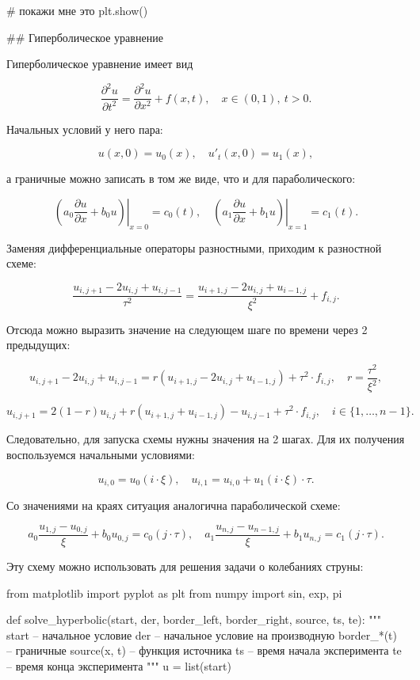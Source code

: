 {# покажи мне это
plt.show()

{%


## Гиперболическое уравнение

Гиперболическое уравнение имеет вид

$$
    \frac{\partial^2 u}{\partial t^2} =
    \frac{\partial^2 u}{\partial x^2} + f(x, t),
    \quad  x\in(0,1),\ t > 0.
$$

Начальных условий у него пара:

$$
  u(x, 0) = u_0(x),\quad u'_t(x, 0) = u_1(x),
$$

а граничные можно записать в том же виде, что и для параболического:

$$
  \left.\left(a_0 \frac{\partial u}{\partial x} + b_0 u\right)\right|_{x=0} = c_0(t),
  \quad
  \left.\left(a_1 \frac{\partial u}{\partial x} + b_1 u\right)\right|_{x=1} = c_1(t).
$$

Заменяя дифференциальные операторы разностными, приходим к разностной схеме:

$$
    \frac{u_{i, j+1} - 2u_{i, j} + u_{i,j-1}}{\tau^2} =
    \frac{u_{i+1, j} - 2u_{i, j} + u_{i-1, j}}{\xi^2} + f_{i, j}.
$$

Отсюда можно выразить значение на следующем шаге по времени через 2 предыдущих:

$$
    u_{i, j + 1} - 2u_{i, j} +  u_{i, j - 1} =
    r(u_{i+1, j} - 2u_{i, j} + u_{i-1, j}) +
    \tau^2\cdot f_{i, j},\quad r = \frac{\tau^2}{\xi^2},
$$

$$
    u_{i, j+1} = 2(1 - r)u_{i, j} + r(u_{i+1, j} + u_{i-1, j}) - u_{i, j-1}
    + \tau^2\cdot f_{i, j},\quad i \in \{1,\ldots, n-1\}.
$$

Следовательно, для запуска схемы нужны значения на 2 шагах. Для их получения
воспользуемся начальными условиями:

$$
    u_{i, 0} = u_0(i \cdot \xi),\quad
    u_{i, 1} = u_{i, 0} + u_1(i \cdot \xi) \cdot \tau.
$$

Со значениями на краях ситуация аналогична параболической схеме:

$$
  a_0 \frac{u_{1, j} - u_{0, j}}{\xi} + b_0 u_{0, j} = c_0(j\cdot\tau),\quad
  a_1 \frac{u_{n, j} - u_{n-1, j}}{\xi} + b_1 u_{n, j} = c_1(j\cdot\tau).
$$

Эту схему можно использовать для решения задачи о колебаниях струны:

{%
from matplotlib import pyplot as plt
from numpy import sin, exp, pi


def solve_hyperbolic(start, der, border_left, border_right, source, ts, te):
    """
    start -- начальное условие
    der -- начальное условие на производную
    border_*(t) -- граничные
    source(x, t) -- функция источника
    ts -- время начала эксперимента
    te -- время конца эксперимента
    """
    u = list(start)

}}}
